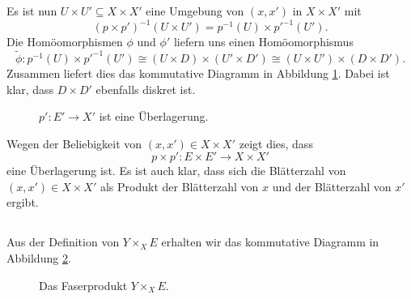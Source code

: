 \documentclass[a4paper,10pt]{article}
\begin{document}
Es ist nun $U \times U' \subseteq X \times X'$ eine Umgebung von $(x,x')$ in $X \times X'$ mit
\[
 \left( p \times p' \right)^{-1} (U \times U') = p^{-1}(U) \times p'^{-1}(U').
\]
Die Homöomorphismen $\phi$ und $\phi'$ liefern uns einen Homöomorphismus
\[
 \tilde{\phi} :
 p^{-1}(U) \times p'^{-1}(U')
 \cong (U \times D) \times (U' \times D')
 \cong (U \times U') \times (D \times D').
\]
Zusammen liefert dies das kommutative Diagramm in Abbildung \ref{fig: Überlagerung für U x U'}. Dabei ist klar, dass $D \times D'$ ebenfalls diskret ist.
\begin{figure}[ht]\centering
 \caption{$p' : E' \to X'$ ist eine Überlagerung.}
 \label{fig: Überlagerung für U x U'}
\end{figure}

Wegen der Beliebigkeit von $(x,x') \in X \times X'$ zeigt dies, dass
\[
 p \times p' : E \times E' \to X \times X'
\]
eine Überlagerung ist. Es ist auch klar, dass sich die Blätterzahl von $(x,x') \in X \times X'$ als Produkt der Blätterzahl von $x$ und der Blätterzahl von $x'$ ergibt.


\subsection{}
Aus der Definition von $Y \times_X E$ erhalten wir das kommutative Diagramm in Abbildung \ref{fig: Faserprodukt}.
\begin{figure}[ht]\centering
 \caption{Das Faserprodukt $Y \times_X E$.}
 \label{fig: Faserprodukt}
\end{figure}
\end{document}
